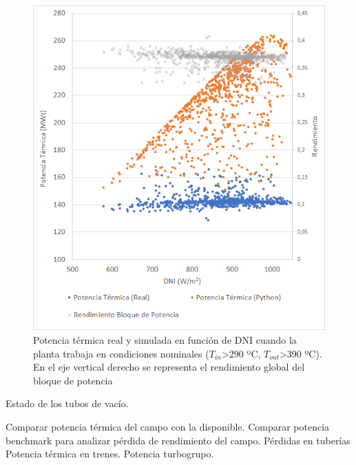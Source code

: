 \begin{figure}[!h]
\includegraphics[width=0.9\linewidth]{images/potencia_dni_aste1b.png}
\caption{Potencia térmica real y simulada en función de DNI cuando la planta trabaja en condiciones nominales ($T_{in}$>290 ºC, $T_{out}$>390 ºC). En el eje vertical derecho se representa el rendimiento global del bloque de potencia} 
\label{fig:potenica_dni}
\end{figure}

Estado de los tubos de vacío. 

Comparar potencia térmica del campo con la disponible.
Comparar potencia benchmark para analizar pérdida de rendimiento del campo.
Pérdidas en tuberías
Potencia térmica en trenes.
Potencia turbogrupo.



 

